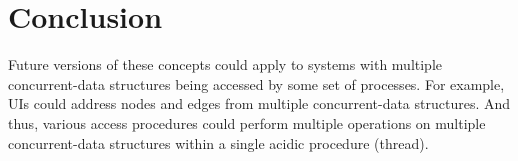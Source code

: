 \section{Conclusion}

Future versions of these concepts could apply to systems with multiple concurrent-data structures being accessed by some set of processes. For example, UIs could address nodes and edges from multiple concurrent-data structures. And thus, various access procedures could perform multiple operations on multiple concurrent-data structures within a single acidic procedure (thread).

